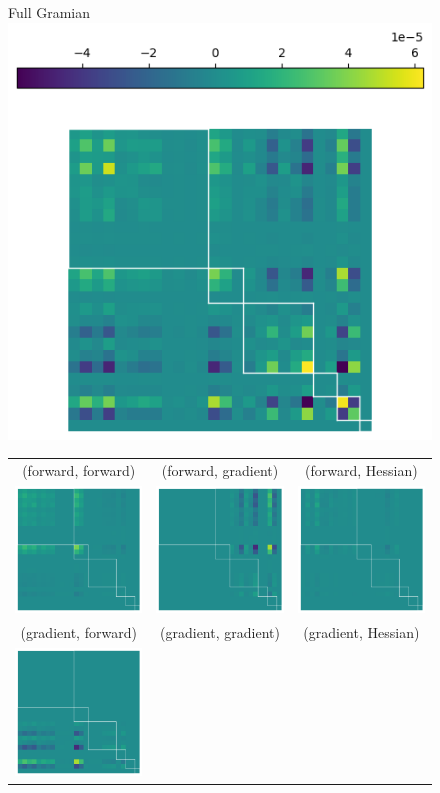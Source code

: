 \begin{figure}
  \centering
  Full Gramian\\
  \includegraphics[width=0.43\linewidth]{../kfac_pinns_exp/exp04_gramian_contributions/fig/gram_full.png}

  \begin{tabular}{ccc}
    (forward, forward)
    &
      (forward, gradient)
    &
      (forward, Hessian)
    \\
    \includegraphics[width=0.22\linewidth]{../kfac_pinns_exp/exp04_gramian_contributions/fig/gram_output_output.png}
    &
      \includegraphics[width=0.22\linewidth]{../kfac_pinns_exp/exp04_gramian_contributions/fig/gram_output_grad_input.png}
    &
      \includegraphics[width=0.22\linewidth]{../kfac_pinns_exp/exp04_gramian_contributions/fig/gram_output_hess_input.png}
    \\
    (gradient, forward)
    &
      (gradient, gradient)
    &
      (gradient, Hessian)
    \\
    \includegraphics[width=0.22\linewidth]{../kfac_pinns_exp/exp04_gramian_contributions/fig/gram_grad_input_output.png}

\end{tabular}
\end{figure}
